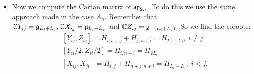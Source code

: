 \begin{itemize}
To find the corresponding weights we compute 
\begin{equation}
    \begin{aligned}
        &[H,Y_{ij}]=(\lambda_i+\lambda_j)E_{i,n+j}+(\lambda_j+\lambda_i)E_{j,n+i}=(L_i+L_j)(H)Y_{ij}\\
        &[H,X_{ij}]=(\lambda_i-\lambda_j)E_{ij}-(-\lambda_j+\lambda_i)E_{n+j,n+i}=(L_i-L_j)(H)X_{ij}\\
        &[H,Z_{ij}]=(-\lambda_i-\lambda_j)E_{n+i,j}+(-\lambda_j-\lambda_i)E_{n+j,i}=-(L_i+L_j)(H)Z_{ij}.
    \end{aligned}
\end{equation}
So 
\begin{equation}
    \Delta = \{L_i-L_j:i\neq j\}\cup \{\pm(L_i+L_j): i\leq j\},\; i,j\in\{1,\dots,n\}.
\end{equation}
The choice of linear functional $f:\fr{h}^*\to\bbR$ such that $f(L_1)>\cdots >f(L_n)>0$ yields positive roots given by 
\begin{equation}
    \Delta_+=\{L_i-L_j: i< j\}\cup \{L_i+L_j : i\leq j\}.
\end{equation}
By excluding roots which are um of other positive roots we get the set of simple roots 
\begin{equation}
    \Pi=\{L_1-L_2,\dots, L_{n-1}-L_n, 2L_n\}. 
\end{equation}
We will write $\alpha_i=L_i-L_{i+1},i=1,\dots,n-1$ and $\alpha_n=2L_n$ to the simple roots. So far we got 
\begin{dang}
    \begin{equation}
        \dim(\fr{sp}_{2n})=2n^2+n,\;\text{Rank}(\fr{sp}_{2n})=n,\;\#\Delta = 2n^2.
    \end{equation}
\end{dang}
\item Now we compute the Cartan matrix of $\mathfrak{sp}_{2n}$. To do this we use the same approach made in the case $A_n$.
Remember that $\mathbb{C} Y_{ij}=\mathfrak{g}_{L_i+L_j}, \mathbb{C} X_{ij}=\mathfrak{g}_{L_i-L_j}$ and $\mathbb{C} Z_{ij}=\mathfrak{g}_{-(L_i+L_j)}$. So we find
the coroots:
\begin{equation}
    \begin{aligned}
        &[Y_{ij},Z_{ij}]=H_{i,n+j}+H_{j,n+i}=H_{L_i+L_j},\;i\neq j \\
        &[Y_{ii}/2,Z_{ii}/2]=H_{i,n+i}=H_{2L_i}\\
        &[X_{ij},X_{ji}]=H_{i,j}+H_{n+j,n+i}=H_{L_i-L_j},\;i<j.
    \end{aligned}
\end{equation}

\end{itemize}
